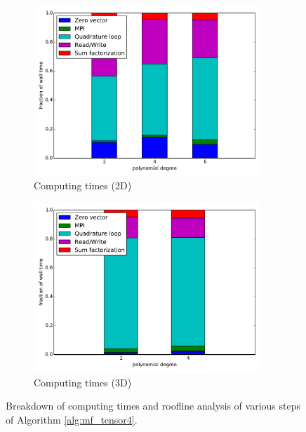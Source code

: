 \documentclass[AMA,STIX1COL]{WileyNJD-v2}
\begin{document}
\begin{figure}[!ht]
  \centering
  \begin{subfigure}[b]{0.49\textwidth}
      \centering
      \includegraphics[width=0.94\textwidth]{LIKWID_CSL_Munich_breakdown_stackedbar_2d.pdf}
      \caption{Computing times (2D)}
      \label{fig:breakdown_stackedbar_2d_tensor4}
  \end{subfigure}
  \begin{subfigure}[b]{0.49\textwidth}
    \centering
    \includegraphics[width=0.94\textwidth]{LIKWID_CSL_Munich_breakdown_stackedbar_3d.pdf}
    \caption{Computing times (3D)}
    \label{fig:breakdown_stackedbar_3d_tensor4}
  \end{subfigure}
  \caption{Breakdown of computing times and roofline analysis of various steps of Algorithm \ref{alg:mf_tensor4}.}%
  \label{fig:breakdown}
\end{figure}
\end{document}

